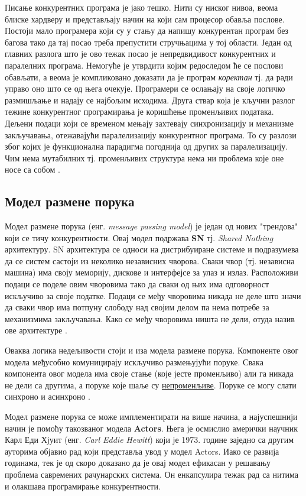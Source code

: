 \documentclass[12pt,oneside]{memoir}
\begin{document}
Писање конкурентних програма је јако тешко. Нити су ниског нивоа, веома блиске хардверу и представљају начин на који сам процесор обавља послове. Постоји мало програмера који су у стању да напишу конкурентан програм без багова тако да тај посао треба препустити стручњацима у тој области. Један од главних разлога што је ово тежак посао је непредвидивост конкурентних и паралелних програма. Немогуће је утврдити којим редоследом ће се послови обављати, а веома је компликовано доказати да је програм \textit{коректан} тј. да ради управо оно што се од њега очекује. Програмери се ослањају на своје логичко размишљање и надају се најбољим исходима. Друга ствар која је кључни разлог тежине конкурентног програмирања је коришћење променљивих података. Дељени подаци који се временом мењају захтевају синхронизацију и механизме закључавања, отежавајући паралелизацију конкурентног програма. То су разлози због којих је функционална парадигма погоднија од других за паралелизацију. Чим нема мутабилних тј. променљивих структура нема ни проблема које оне носе са собом \cite{progInScala3}.

\subsection{Модел размене порука}

Модел размене порука (енг. \textit{message passing model}) је један од нових "трендова" који се тичу конкурентности. Овај модел подржава \textbf{SN} тј. \textit{Shared Nothing} архитектуру. SN архитектура се односи на дистрибуиране системе и подразумева да се систем састоји из неколико независних чворова. Сваки чвор (тј. независна машина) има своју меморију, дискове и интерфејсе за улаз и излаз. Расположиви подаци се поделе овим чворовима тако да сваки од њих има одговорност искључиво за своје податке. Подаци се међу чворовима никада не деле што значи да сваки чвор има потпуну слободу над својим делом па нема потребе за механизмима закључавања. Како се међу чворовима ништа не дели, отуда назив ове архитектуре \cite{SNvsSD, warehouse}.

Оваква логика недељивости стоји и иза модела размене порука. Компоненте овог модела међусобно комуницирају искључиво размењујући поруке. Свака компонента овог модела има своје стање (које јесте променљиво) али га никада не дели са другима, а поруке које шаље су \underline{непроменљиве}. Поруке се могу слати синхроно и асинхроно \cite{progInScala}.

Модел размене порука се може имплементирати на више начина, а најуспешнији начин је помоћу такозваног модела \textbf{Actors}. Њега је осмислио амерички научник Карл Еди Хјуит (енг. \textit{Carl Eddie Hewitt}) који је 1973. године заједно са другим ауторима објавио рад који представља увод у модел Actors. Иако се развија годинама, тек је од скоро доказано да је овај модел ефикасан у решавању проблема савремених рачунарских система. Он енкапсулира тежак рад са нитима и олакшава програмирање конкурентности. 
\end{document}
